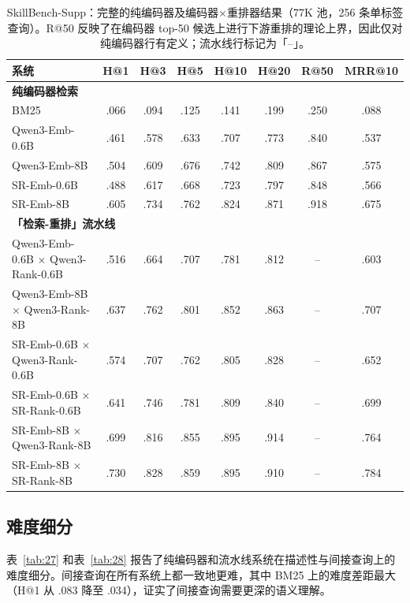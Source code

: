 \documentclass[11pt,UTF8,fontset=fandol]{ctexart}
\begin{document}
\begin{table}[H]\centering
\caption{SkillBench-Supp：完整的纯编码器及编码器$\times$重排器结果（77K 池，256 条单标签查询）。R@50 反映了在编码器 top-50 候选上进行下游重排的理论上界，因此仅对纯编码器行有定义；流水线行标记为「--」。}
\small
\begin{tabular}{lccccccc}
\toprule
系统 & H@1 & H@3 & H@5 & H@10 & H@20 & R@50 & MRR@10 \\ \midrule
\multicolumn{8}{l}{\textbf{纯编码器检索}} \\
BM25 & .066 & .094 & .125 & .141 & .199 & .250 & .088 \\
Qwen3-Emb-0.6B & .461 & .578 & .633 & .707 & .773 & .840 & .537 \\
Qwen3-Emb-8B & .504 & .609 & .676 & .742 & .809 & .867 & .575 \\
SR-Emb-0.6B & .488 & .617 & .668 & .723 & .797 & .848 & .566 \\
SR-Emb-8B & .605 & .734 & .762 & .824 & .871 & .918 & .675 \\
\multicolumn{8}{l}{\textbf{「检索-重排」流水线}} \\
Qwen3-Emb-0.6B $\times$ Qwen3-Rank-0.6B & .516 & .664 & .707 & .781 & .812 & -- & .603 \\
Qwen3-Emb-8B $\times$ Qwen3-Rank-8B & .637 & .762 & .801 & .852 & .863 & -- & .707 \\
SR-Emb-0.6B $\times$ Qwen3-Rank-0.6B & .574 & .707 & .762 & .805 & .828 & -- & .652 \\
SR-Emb-0.6B $\times$ SR-Rank-0.6B & .641 & .746 & .781 & .809 & .840 & -- & .699 \\
SR-Emb-8B $\times$ Qwen3-Rank-8B & .699 & .816 & .855 & .895 & .914 & -- & .764 \\
SR-Emb-8B $\times$ SR-Rank-8B & .730 & .828 & .859 & .895 & .910 & -- & .784 \\
\bottomrule
\end{tabular}
\label{tab:26}
\end{table}

\subsection{难度细分}

表~\ref{tab:27} 和表~\ref{tab:28} 报告了纯编码器和流水线系统在描述性与间接查询上的难度细分。间接查询在所有系统上都一致地更难，其中 BM25 上的难度差距最大（H@1 从 .083 降至 .034），证实了间接查询需要更深的语义理解。
\end{document}
